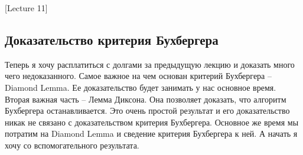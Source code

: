 [Lecture 11]


\subsection{Доказательство критерия Бухбергера}

Теперь я хочу расплатиться с долгами за предыдущую лекцию и доказать много чего недоказанного.
Самое важное на чем основан критерий Бухбергера -- Diamond Lemma.
Ее доказательство будет занимать у нас основное время.
Вторая важная часть -- Лемма Диксона.
Она позволяет доказать, что алгоритм Бухбергера останавливается.
Это очень простой результат и его доказательство никак не связано с доказательством критерия Бухбергера.
Основное же время мы потратим на Diamond Lemma и сведение критерия Бухбергера к ней.
А начать я хочу со вспомогательного результата.

